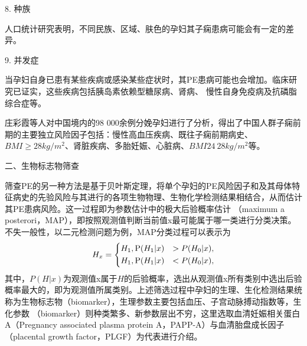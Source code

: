8. 种族

人口统计研究表明，不同民族、区域、肤色的孕妇其子痫患病可能会有一定的差异\cite{Ghosh2014,Khalil2013}。

9. 并发症

当孕妇自身已患有某些疾病或感染某些症状时，其PE患病可能也会增加\cite{FIGO,Ray2016,OAG9}。临床研究已证实，这些疾病包括胰岛素依赖型糖尿病\cite{Lee2000,Garner1990}、肾病\cite{Martinell1990}、
慢性自身免疫病\cite{Stamilio2000}及抗磷脂综合症\cite{Dreyfus2001,Marchetti2016}等。

        

庄彩霞等人\cite{Zhuang2019}对中国境内的98 000余例分娩孕妇进行了分析，得出了中国人群子痫前期的主要独立风险因子包括：慢性高血压疾病、既往子痫前期病史、$BMI≥28kg/m^2$、肾脏疾病、多胎妊娠、心脏病、$BMI 24~28kg/m^2$等。

二、生物标志物筛查

筛查PE的另一种方法是基于贝叶斯定理，将单个孕妇的PE风险因子和及其母体特征病史的先验风险与其进行的各项生物物理、生物化学检测结果相结合，从而估计其PE患病风险\cite{FIGO}。这一过程即为参数估计中的极大后验概率估计
（maximum a posterori，MAP），即按照观测值判断当前值x最可能属于哪一类进行分类决策\cite{TJXHCL}。不失一般性，以二元检测问题为例，MAP分类过程可以表示为
\begin{equation}
    \label{equ:maxap}
    H_{x}=
    \left \{
    \begin{aligned}
        &H_{1}, \text P(H_{1}|x)&>P(H_{0}|x), \\
        &H_{1}, \text P(H_{1}|x)&<P(H_{0}|x),
    \end{aligned}
    \right.  
\end{equation}
其中，$P(H|x)$为观测值x属于$H$的后验概率，选出从观测值x所有类别中选出后验概率最大的，即为观测值所属类别。上述筛选过程中孕妇的生理、生化检测结果统称为生物标志物（biomarker），生理参数主要包括血压、子宫动脉搏动指数等，生化参数
（biomarker）则种类繁多、新参数层出不穷\cite{Rene2008,Zhong2015}，这里选取血清妊娠相关蛋白A（Pregnancy associated plasma protein A，PAPP-A）与血清胎盘成长因子（placental growth factor，PLGF）为代表进行介绍。

